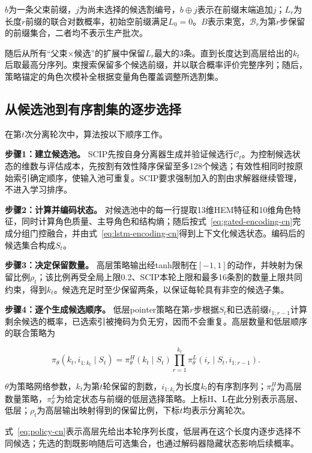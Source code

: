 \documentclass[final,5p,times,twocolumn]{elsarticle}
\begin{document}
$b$为一条父束前缀，$j$为尚未选择的候选割编号，$b\oplus j$表示在前缀末端追加$j$；$L_r$为长度$r$前缀的联合对数概率，初始空前缀满足$L_0=0$。$B$表示束宽，$\mathcal B_r$为第$r$步保留的前缀集合，二者均不表示生产批次。


随后从所有“父束$\times$候选”的扩展中保留$L_r$最大的3条。直到长度达到高层给出的$k_t$后取最高分序列。束搜索保留多个候选前缀，并以联合概率评价完整序列；随后，策略锚定的角色次模补全根据变量角色覆盖调整所选割集。

\subsection{从候选池到有序割集的逐步选择}

在第$t$次分离轮次中，算法按以下顺序工作。

\noindent\textbf{步骤1：建立候选池。} SCIP先按自身分离器生成并验证候选行$\mathcal C_t$。为控制候选状态的维数与评估成本，先按割有效性降序保留至多128个候选；有效性相同时按原始索引确定顺序，使输入池可重复。SCIP要求强制加入的割由求解器继续管理，不进入学习排序。

\noindent\textbf{步骤2：计算并编码状态。} 对候选池中的每一行提取13维HEM特征和10维角色特征，同时计算角色质量、主导角色和结构熵；随后按式~\eqref{eq:gated-encoding-cn}完成分组门控融合，并由式~\eqref{eq:lstm-encoding-cn}得到上下文化候选状态。编码后的候选集合构成$S_t$。

\noindent\textbf{步骤3：决定保留数量。} 高层策略输出经tanh限制在$[-1,1]$的动作，并映射为保留比例$\rho_t$；该比例再受全局上限0.2、SCIP本轮上限和最多16条割的数量上限共同约束，得到$k_t$。候选充足时至少保留两条，以保证每轮具有非空的候选子集。

\noindent\textbf{步骤4：逐个生成候选顺序。} 低层pointer策略在第$r$步根据$S_t$和已选前缀$i_{1:r-1}$计算剩余候选的概率，已选索引被掩码为负无穷，因而不会重复。高层数量和低层顺序的联合策略为

\begin{equation}
\pi_\theta(k_t,i_{1:k_t}\mid S_t)=\pi_\theta^H(k_t\mid S_t)
\prod_{r=1}^{k_t}\pi_\theta^L(i_r\mid S_t,i_{1:r-1}).
\label{eq:policy-cn}
\end{equation}

$\theta$为策略网络参数，$k_t$为第$t$轮保留的割数，$i_{1:k_t}$为长度$k_t$的有序割序列；$\pi_\theta^H$为高层数量策略，$\pi_\theta^L$为给定状态与前缀的低层选择策略。上标H、L在此分别表示高层、低层；$\rho_t$为高层输出映射得到的保留比例，下标$t$均表示分离轮次。


式~\eqref{eq:policy-cn}表示高层先给出本轮序列长度，低层再在这个长度内逐步选择不同候选；先选的割既影响随后可选集合，也通过解码器隐藏状态影响后续概率。
\end{document}
